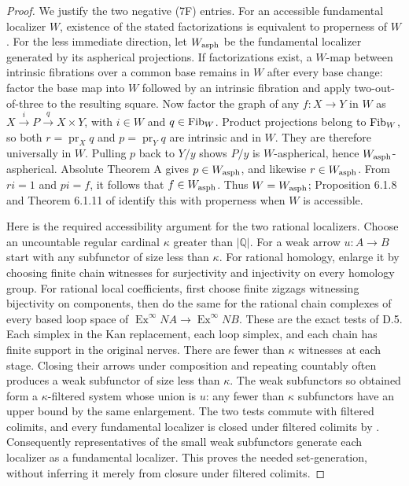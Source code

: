 \begin{proof}
We justify the two negative (7F) entries. For an accessible fundamental localizer $W$, existence of the stated factorizations is equivalent to properness of $W$. For the less immediate direction, let $W_{\rm asph}$ be the fundamental localizer generated by its aspherical projections. If factorizations exist, a $W$-map between intrinsic fibrations over a common base remains in $W$ after every base change: factor the base map into $W$ followed by an intrinsic fibration and apply two-out-of-three to the resulting square. Now factor the graph of any $f:X\to Y$ in $W$ as $X\xrightarrow{i}P\xrightarrow{q}X\times Y$, with $i\in W$ and $q\in\mathrm{Fib}_W$. Product projections belong to $\mathrm{Fib}_W$, so both $r=\operatorname{pr}_Xq$ and $p=\operatorname{pr}_Yq$ are intrinsic and in $W$. They are therefore universally in $W$. Pulling $p$ back to $Y/y$ shows $P/y$ is $W$-aspherical, hence $W_{\rm asph}$-aspherical. Absolute Theorem A gives $p\in W_{\rm asph}$, and likewise $r\in W_{\rm asph}$. From $ri=1$ and $pi=f$, it follows that $f\in W_{\rm asph}$. Thus $W=W_{\rm asph}$; Proposition 6.1.8 and Theorem 6.1.11 of \citet{RESCisinski2006} identify this with properness when $W$ is accessible.

Here is the required accessibility argument for the two rational localizers. Choose an uncountable regular cardinal $\kappa$ greater than $|\mathbb Q|$. For a weak arrow $u:A\to B$ start with any subfunctor of size less than $\kappa$. For rational homology, enlarge it by choosing finite chain witnesses for surjectivity and injectivity on every homology group. For rational local coefficients, first choose finite zigzags witnessing bijectivity on components, then do the same for the rational chain complexes of every based loop space of $\operatorname{Ex}^{\infty}NA\to\operatorname{Ex}^{\infty}NB$. These are the exact tests of D.5. Each simplex in the Kan replacement, each loop simplex, and each chain has finite support in the original nerves. There are fewer than $\kappa$ witnesses at each stage. Closing their arrows under composition and repeating countably often produces a weak subfunctor of size less than $\kappa$. The weak subfunctors so obtained form a $\kappa$-filtered system whose union is $u$: any fewer than $\kappa$ subfunctors have an upper bound by the same enlargement. The two tests commute with filtered colimits, and every fundamental localizer is closed under filtered colimits by \citet[Corollary 4.2.22]{RESCisinski2006}. Consequently representatives of the small weak subfunctors generate each localizer as a fundamental localizer. This proves the needed set-generation, without inferring it merely from closure under filtered colimits.


\end{proof}
